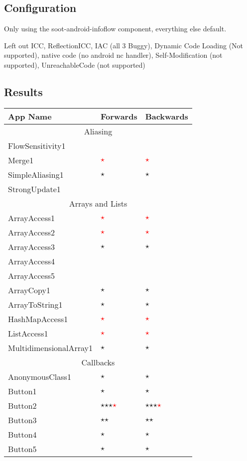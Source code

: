\documentclass[../draft.tex]{subfiles}
\newcommand{\fp}{\textcolor{white}{\textcircled{\textcolor{red}{$\star$}}}}
\newcommand{\tp}[0]{\textcircled{$\star$}}
\newcommand{\tsub}[1]{\multicolumn{3}{c}{#1}\\\hline}
\begin{document}
    \subsection{Configuration}
    Only using the soot-android-infoflow component, everything else default.

    Left out ICC, ReflectionICC, IAC (all 3 Buggy), Dynamic Code Loading (Not supported), native code (no android nc handler), Self-Modification (not supported), UnreachableCode (not supported)

    \subsection{Results}

    \begin{longtable}{l | l | l}%
        \textbf{App Name} & \textbf{Forwards} & \textbf{Backwards}\\
        \hline\hline
        \endhead
        \tsub{Aliasing}
        FlowSensitivity1 & &\\
        Merge1 & \fp & \fp\\
        SimpleAliasing1 & \tp & \tp\\
        StrongUpdate1 & &\\
        \hline
        \tsub{Arrays and Lists}
        ArrayAccess1 & \fp & \fp\\
        ArrayAccess2 & \fp & \fp\\
        ArrayAccess3 & \tp & \tp\\
        ArrayAccess4 &  & \\
        ArrayAccess5 &  & \\
        ArrayCopy1 & \tp & \tp\\
        ArrayToString1 & \tp & \tp\\
        HashMapAccess1 & \fp & \fp\\
        ListAccess1 & \fp & \fp\\
        MultidimensionalArray1 & \tp & \tp\\
        \hline
        \tsub{Callbacks}
        AnonymousClass1 & \tp & \tp\\
        Button1 & \tp & \tp \\
        Button2 & \tp \tp \tp \fp & \tp \tp \tp \fp\\
        Button3 & \tp \tp & \tp \tp\\
        Button4 & \tp & \tp\\
        Button5 & \tp & \tp\\

\end{longtable}
\end{document}
